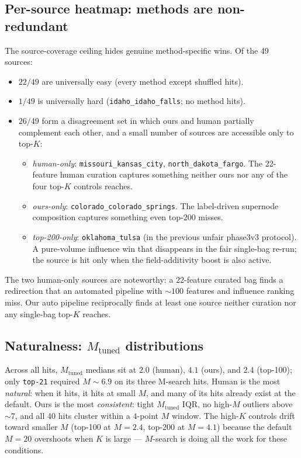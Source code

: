 \subsection{Per-source heatmap: methods are non-redundant}
The source-coverage ceiling hides genuine method-specific wins. Of the 49 sources:

\begin{itemize}\itemsep0pt
\item $22 / 49$ are universally easy (every method except shuffled hits).
\item $1 / 49$ is universally hard (\texttt{idaho\_idaho\_falls}; no method hits).
\item $26 / 49$ form a disagreement set in which ours and human partially complement each other, and a small number of sources are accessible only to top-$K$:
  \begin{itemize}\itemsep0pt
  \item \emph{human-only}: \texttt{missouri\_kansas\_city}, \texttt{north\_dakota\_fargo}. The 22-feature human curation captures something neither ours nor any of the four top-$K$ controls reaches.
  \item \emph{ours-only}: \texttt{colorado\_colorado\_springs}. The label-driven supernode composition captures something even top-200 misses.
  \item \emph{top-200-only}: \texttt{oklahoma\_tulsa} (in the previous unfair phase3v3 protocol). A pure-volume influence win that disappears in the fair single-bag re-run; the source is hit only when the field-additivity boost is also active.
  \end{itemize}
\end{itemize}

The two human-only sources are noteworthy: a $22$-feature curated bag finds a redirection that an automated pipeline with $\sim 100$ features and influence ranking miss. Our auto pipeline reciprocally finds at least one source neither curation nor any single-bag top-$K$ reaches.

\subsection{Naturalness: $M_{\mathrm{tuned}}$ distributions}
Across all hits, $M_{\mathrm{tuned}}$ medians sit at $2.0$ (human), $4.1$ (ours), and $2.4$ (top-100); only \texttt{top-21} required $M{\sim}6.9$ on its three M-search hits. Human is the most \emph{natural}: when it hits, it hits at small $M$, and many of its hits already exist at the default. Ours is the most \emph{consistent}: tight $M_{\mathrm{tuned}}$ IQR, no high-$M$ outliers above ${\sim}7$, and all 40 hits cluster within a $4$-point $M$ window. The high-$K$ controls drift toward smaller $M$ (top-100 at $M{=}2.4$, top-200 at $M{=}4.1$) because the default $M{=}20$ overshoots when $K$ is large --- $M$-search is doing all the work for these conditions.


